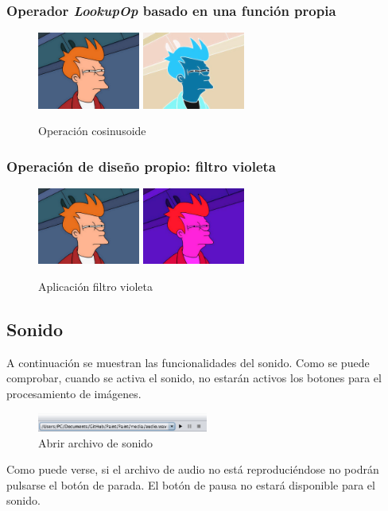 \subsubsection{Operador \textit{LookupOp} basado en una función propia}
\begin{figure}[H]
 \centering
  \includegraphics[width=0.3\textwidth]{imagenes/Fry.jpg}
  \includegraphics[width=0.3\textwidth]{imagenes/fryCos.jpg}
 \caption{Operación cosinusoide}
 \label{diseño}
 \end{figure}
\subsubsection{Operación de diseño propio: filtro violeta}
\vskip0.3cm
\begin{figure}[H]
 \centering
  \includegraphics[width=0.3\textwidth]{imagenes/Fry.jpg}
  \includegraphics[width=0.3\textwidth]{imagenes/fryVioleta.jpg}
 \caption{Aplicación filtro violeta}
 \label{diseño}
 \end{figure}
\subsection{Sonido}
A continuación se muestran las funcionalidades del sonido. Como se puede comprobar, cuando se activa el sonido, no estarán activos los botones para el procesamiento de imágenes.
\vskip0.3cm
\begin{figure}[H]
 \centering
  \includegraphics[width=0.5\textwidth]{sonido/archivoAbierto.png}
 \caption{Abrir archivo de sonido}
 \label{diseño}
 \end{figure}
Como puede verse, si el archivo de audio no está reproduciéndose no podrán pulsarse el botón de parada. El botón de pausa no estará disponible para el sonido.
